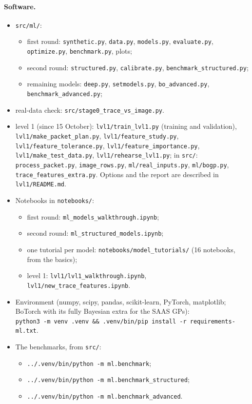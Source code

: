 \documentclass[10pt]{article}
\newcommand{\code}[1]{\texttt{#1}}
\begin{document}
\paragraph{Software.}
\begin{raggedright}
\begin{itemize}
\item \code{src/ml/}:
  \begin{itemize}
  \item first round: \code{synthetic.py}, \code{data.py}, \code{models.py}, \code{evaluate.py}, \code{optimize.py}, \code{benchmark.py}, plots;
  \item second round: \code{structured.py}, \code{calibrate.py}, \code{benchmark\_structured.py};
  \item remaining models: \code{deep.py}, \code{setmodels.py}, \code{bo\_advanced.py}, \code{benchmark\_advanced.py};
  \end{itemize}
\item real-data check: \code{src/stage0\_trace\_vs\_image.py}.
\item level 1 (since 15 October): \code{lvl1/train\_lvl1.py} (training and validation), \code{lvl1/make\_packet\_plan.py},
  \code{lvl1/feature\_study.py}, \code{lvl1/feature\_tolerance.py}, \code{lvl1/feature\_importance.py}, \code{lvl1/make\_test\_data.py},
  \code{lvl1/rehearse\_lvl1.py}; in \code{src/}: \code{process\_packet.py}, \code{image\_rows.py}, \code{ml/real\_inputs.py},
  \code{ml/bogp.py}, \code{trace\_features\_extra.py}. Options and the report are described in \code{lvl1/README.md}.
\item Notebooks in \code{notebooks/}:
  \begin{itemize}
  \item first round: \code{ml\_models\_walkthrough.ipynb};
  \item second round: \code{ml\_structured\_models.ipynb};
  \item one tutorial per model: \code{notebooks/model\_tutorials/} (16 notebooks, from the basics);
  \item level 1: \code{lvl1/lvl1\_walkthrough.ipynb}, \code{lvl1/new\_trace\_features.ipynb}.
  \end{itemize}
\item Environment (numpy, scipy, pandas, scikit-learn, PyTorch, matplotlib; BoTorch with its fully Bayesian extra for the SAAS GPs):\\
  \code{python3 -m venv .venv \&\& .venv/bin/pip install -r requirements-ml.txt}.
\item The benchmarks, from \code{src/}:
  \begin{itemize}
  \item \code{../.venv/bin/python -m ml.benchmark};
  \item \code{../.venv/bin/python -m ml.benchmark\_structured};
  \item \code{../.venv/bin/python -m ml.benchmark\_advanced}.
  \end{itemize}
\end{itemize}
\end{raggedright}
\end{document}
